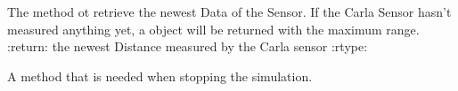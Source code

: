 \documentclass[letterpaper,10pt,english]{sphinxmanual}
\begin{document}
\begin{fulllineitems}
\begin{fulllineitems}
\label{\detokenize{sim_interfaces:lib.sim_interfaces.SimSensor.read_measurements}}
The method ot retrieve the newest Data of the Sensor. If the Carla Sensor hasn’t measured anything yet,
a {\hyperref[\detokenize{data:lib.data.Distance}]{}} object will be returned with the maximum range.
:return: the newest Distance measured by the Carla sensor
:rtype: {\hyperref[\detokenize{data:lib.data.Distance}]{}}

\end{fulllineitems}


\begin{fulllineitems}
\label{\detokenize{sim_interfaces:lib.sim_interfaces.SimSensor.stop}}
A method that is needed when stopping the simulation.

\end{fulllineitems}


\end{fulllineitems}

\end{document}
